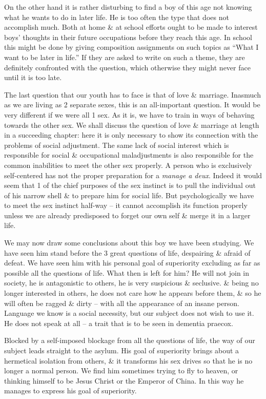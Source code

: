 \documentclass{article}
\begin{document}
On the other hand it is rather disturbing to find a boy of this age not knowing what he wants to do in later life. He is too often the type that does not accomplish much. Both at home \& at school efforts ought to be made to interest boys' thoughts in their future occupations before they reach this age. In school this might be done by giving composition assignments on such topics as ``What I want to be later in life.'' If they are asked to write on such a theme, they are definitely confronted with the question, which otherwise they might never face until it is too late.

The last question that our youth has to face is that of love \& marriage. Inasmuch as we are living as 2 separate sexes, this is an all-important question. It would be very different if we were all 1 sex. As it is, we have to train in ways of behaving towards the other sex. We shall discuss the question of love \& marriage at length in a succeeding chapter: here it is only necessary to show its connection with the problems of social adjustment. The same lack of social interest which is responsible for social \& occupational maladjustments is also responsible for the common inabilities to meet the other sex properly. A person who is exclusively self-centered has not the proper preparation for a \textit{manage a deux}. Indeed it would seem that 1 of the chief purposes of the sex instinct is to pull the individual out of his narrow shell \& to prepare him for social life. But psychologically we have to meet the sex instinct half-way -- it cannot accomplish its function properly unless we are already predisposed to forget our own self \& merge it in a larger life.

We may now draw some conclusions about this boy we have been studying. We have seen him stand before the 3 great questions of life, despairing \& afraid of defeat. We have seen him with his personal goal of superiority excluding as far as possible all the questions of life. What then is left for him? He will not join in society, he is antagonistic to others, he is very suspicious \& seclusive. \& being no longer interested in others, he does not care how he appears before them, \& so he will often be ragged \& dirty -- with all the appearance of an insane person. Language we know is a social necessity, but our subject does not wish to use it. He does not speak at all -- a trait that is to be seen in dementia praecox.

Blocked by a self-imposed blockage from all the questions of life, the way of our subject leads straight to the asylum. His goal of superiority brings about a hermetical isolation from others, \& it transforms his sex drives so that he is no longer a normal person. We find him sometimes trying to fly to heaven, or thinking himself to be Jesus Christ or the Emperor of China. In this way he manages to express his goal of superiority.
\end{document}
